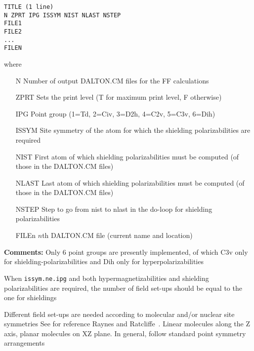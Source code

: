 \begin{verbatim}
TITLE (1 line)
N ZPRT IPG ISSYM NIST NLAST NSTEP
FILE1
FILE2
... 
FILEN 
\end{verbatim}
where
\begin{itemize}
\item[N] Number of output DALTON.CM files for the FF calculations
\item[ZPRT]  Sets the print level (T for maximum print level, F otherwise)
\item[IPG] Point group (1=Td, 2=Civ, 3=D2h, 4=C2v, 5=C3v, 6=Dih)
\item[ISSYM] Site symmetry of the atom for which the shielding
               polarizabilities are required
\item[NIST] First atom of which shielding polarizabilities must be computed
               (of those in  the DALTON.CM files)
\item[NLAST] Last atom of which shielding polarizabilities must be computed
               (of those in  the DALTON.CM files)
\item[NSTEP] Step to go from nist to nlast in the do-loop for
               shielding polarizabilities
\item[FILEn] $n$th DALTON.CM file (current name and location)
\end{itemize}

\smallskip
\noindent
{\bf Comments:} 
    Only 6 point groups are presently implemented, of which
    C3v only for shielding-polarizabilities and 
    Dih only for hyperpolarizabilities 

    When \verb|issym.ne.ipg| and both
    hypermagnetizabilities and shielding 
    polarizabilities are required, the number of field set-ups should 
    be equal to the one for shieldings

    Different field set-ups are needed according to
    molecular  and/or nuclear site symmetries
    See for reference Raynes and Ratcliffe~\cite{wtrrrmp37}.
    Linear molecules along the Z axis, planar molecules
    on XZ plane. In general, follow standard point
    symmetry arrangements

